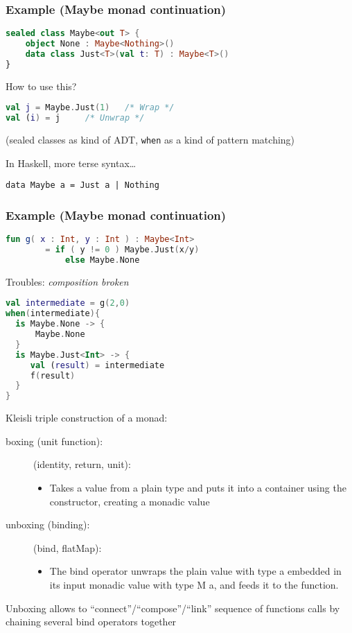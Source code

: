 \documentclass[10pt]{beamer}
\begin{document}
\begin{frame}[fragile]
\frametitle{Example (Maybe monad continuation)}
\begin{lstlisting}[language=Kotlin, basicstyle=\ttfamily]
sealed class Maybe<out T> {
    object None : Maybe<Nothing>()
    data class Just<T>(val t: T) : Maybe<T>()
}
\end{lstlisting}
How to use this?
\begin{lstlisting}[language=Kotlin, basicstyle=\ttfamily]
val j = Maybe.Just(1) 	/* Wrap */
val (i) = j		/* Unwrap */	
\end{lstlisting}
(sealed classes as kind of ADT, \verb|when| as a kind of pattern matching)

In Haskell, more terse syntax\ldots 
\begin{lstlisting}
data Maybe a = Just a | Nothing
\end{lstlisting}
\end{frame}
\begin{frame}[fragile]
\frametitle{Example (Maybe monad continuation)}
\begin{lstlisting}[language=Kotlin, basicstyle=\ttfamily]
fun g( x : Int, y : Int ) : Maybe<Int>
        = if ( y != 0 ) Maybe.Just(x/y)
            else Maybe.None
\end{lstlisting}
Troubles: \emph{composition broken}
\begin{lstlisting}[language=Kotlin, basicstyle=\ttfamily]
val intermediate = g(2,0)
when(intermediate){
  is Maybe.None -> {
      Maybe.None
  }
  is Maybe.Just<Int> -> {
     val (result) = intermediate
     f(result)
  }
}    
\end{lstlisting}
\end{frame}
\begin{frame}[fragile]
	Kleisli triple construction of a monad:
	\begin{description}
		\item[boxing (unit function):] (identity, return, unit): 
			\begin{itemize}
				\item Takes a value from a plain type and puts it into a container using the constructor, creating a monadic value
			\end{itemize}
		\item [unboxing (binding):]  (bind, flatMap):
			\begin{itemize}
				\item 
					The bind operator unwraps the plain value with type a embedded in its input monadic value with type M a, and feeds it to the function.
			\end{itemize}
	\end{description}
			Unboxing allows to ``connect''/``compose''/``link'' sequence of functions  calls by chaining several bind operators together
\end{frame}
\end{document}
